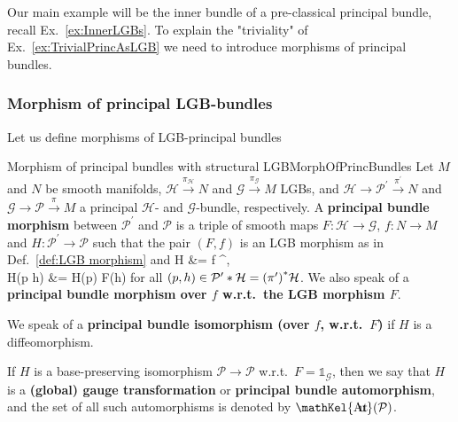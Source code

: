 \documentclass[a4paper,oneside,11pt,bibliography=totoc]{scrartcl}
\DeclareMathOperator{\sAut}{\mathKel{A\mkern-5.5mu u\mkern-4mu t\mkern-1.5mu}}
\def\ba#1\ea{\begin{align}#1\end{align}}
\theoremstyle{plain}
\theoremstyle{remark}
\theoremstyle{definition}
\begin{document}
Our main example will be the inner bundle of a pre-classical principal bundle, recall Ex.\ \ref{ex:InnerLGBs}. To explain the "triviality" of Ex.\ \ref{ex:TrivialPrincAsLGB} we need to introduce morphisms of principal bundles.

\subsubsection{Morphism of principal LGB-bundles}

Let us define morphisms of LGB-principal bundles

\begin{definitions}{Morphism of principal bundles with structural LGB}{MorphOfPrincBundles}
Let $M$ and $N$ be smooth manifolds, $\mathcal{H} \stackrel{\pi_{\mathcal{H}}}{\to} N$ and $\mathcal{G} \stackrel{\pi_{\mathcal{G}}}{\to} M$ LGBs, and $\mathcal{H} \to \mathcal{P}^\prime \stackrel{\pi^\prime}{\to} N$ and $\mathcal{G} \to \mathcal{P} \stackrel{\pi}{\to} M$ a principal $\mathcal{H}$- and $\mathcal{G}$-bundle, respectively. A \textbf{principal bundle morphism} between $\mathcal{P}^\prime$ and $\mathcal{P}$ is a triple of smooth maps $F: \mathcal{H} \to \mathcal{G}$, $f: N \to M$ and $H: \mathcal{P}^\prime \to \mathcal{P}$ such that the pair $(F, f)$ is an LGB morphism as in Def.\ \ref{def:LGB morphism} and
\ba
\pi \circ H &= f \circ \pi^\prime,\label{PrincMorphoverBaseMap}\\
H(p \cdot h) &= H(p) \cdot F(h)\label{PrincMorphLGBEquiv}
\ea
for all $(p, h) \in \mathcal{P}^\prime * \mathcal{H} = \mleft(\pi^\prime\mright)^*\mathcal{H}$. We also speak of a \textbf{principal bundle morphism over $f$ w.r.t.\ the LGB morphism $F$}.

We speak of a \textbf{principal bundle isomorphism (over $f$, w.r.t.\ $F$)} if $H$ is a diffeomorphism. 

If $H$ is a base-preserving isomorphism $\mathcal{P} \to \mathcal{P}$ w.r.t.\ $F = \mathds{1}_{\mathcal{G}}$, then we say that $H$ is a \textbf{(global) gauge transformation} or \textbf{principal bundle automorphism}, and the set of all such automorphisms is denoted by $\sAut(\mathcal{P})$.
\end{definitions}
\end{document}
